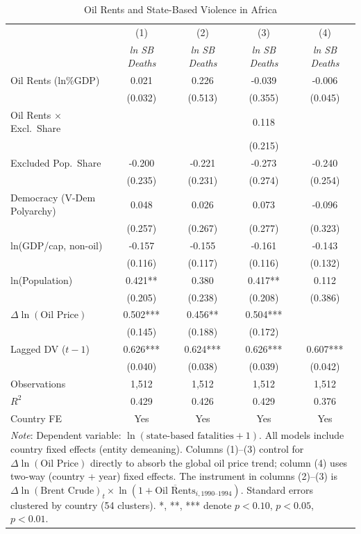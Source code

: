 \begin{table}[htbp]\centering\small
\caption{Oil Rents and State-Based Violence in Africa}\label{tab:main}
\begin{tabular}{lcccc}
\toprule
 & (1) & (2) & (3) & (4) \\
 & \textit{ln SB Deaths} & \textit{ln SB Deaths} & \textit{ln SB Deaths} & \textit{ln SB Deaths} \\
\midrule
Oil Rents (ln\%GDP) & 0.021 & 0.226 & -0.039 & -0.006 \\
 & (0.032) & (0.513) & (0.355) & (0.045) \\
Oil Rents $\times$ Excl.\ Share &  &  & 0.118 &  \\
 &  &  & (0.215) &  \\
Excluded Pop.\ Share & -0.200 & -0.221 & -0.273 & -0.240 \\
 & (0.235) & (0.231) & (0.274) & (0.254) \\
Democracy (V-Dem Polyarchy) & 0.048 & 0.026 & 0.073 & -0.096 \\
 & (0.257) & (0.267) & (0.277) & (0.323) \\
ln(GDP/cap, non-oil) & -0.157 & -0.155 & -0.161 & -0.143 \\
 & (0.116) & (0.117) & (0.116) & (0.132) \\
ln(Population) & 0.421** & 0.380 & 0.417** & 0.112 \\
 & (0.205) & (0.238) & (0.208) & (0.386) \\
$\Delta \ln(\text{Oil Price})$ & 0.502*** & 0.456** & 0.504*** &  \\
 & (0.145) & (0.188) & (0.172) &  \\
Lagged DV ($t-1$) & 0.626*** & 0.624*** & 0.626*** & 0.607*** \\
 & (0.040) & (0.038) & (0.039) & (0.042) \\
\midrule
Observations & 1,512 & 1,512 & 1,512 & 1,512 \\
$R^2$ & 0.429 & 0.426 & 0.429 & 0.376 \\
Country FE & Yes & Yes & Yes & Yes \\
\bottomrule
\multicolumn{5}{p{0.95\linewidth}}{\footnotesize
\textit{Note}: Dependent variable: $\ln(\text{state-based fatalities}+1)$. All models include country fixed effects (entity demeaning). Columns (1)--(3) control for $\Delta\ln(\text{Oil Price})$ directly to absorb the global oil price trend; column (4) uses two-way (country + year) fixed effects. The instrument in columns (2)--(3) is $\Delta\ln(\text{Brent Crude})_t \times \ln(1+\overline{\text{Oil Rents}}_{i,1990\text{--}1994})$. Standard errors clustered by country (54 clusters). *, **, *** denote $p<0.10$, $p<0.05$, $p<0.01$.}
\end{tabular}
\end{table}
